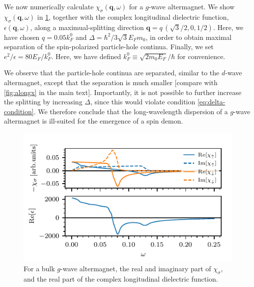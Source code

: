 \documentclass[aps,prb,reprint,twocolumns,superscriptaddress,nofootinbib]{revtex4-2}
\newcommand{\kF}{k_{F}}
\begin{document}
	
	
	We now numerically calculate $\chi_{\sigma}(\bm q,\omega)$ for a $g$-wave altermagnet. We show $\chi_{\sigma}(\bm q,\omega)$ in \cref{fig:g-wave}, together with the complex longitudinal dielectric function, $\epsilon(\bm q,\omega)$, along a maximual-splitting direction $\bm q = q\, \left(\sqrt{3}/2,0,1/2\right)$. Here, we have chosen $q=0.05\kF^0$ and $\Delta ={\hbar^2}/{3\sqrt{3}E_F m_0 }$, in order to obtain maximal separation of  the spin-polarized particle-hole continua. Finally, we set $e^2/\epsilon = 80 E_F/\kF^0$. Here, we have defined $\kF^0\equiv \sqrt{2m_0E_F}/\hbar$ for convenience. 
	
	We observe that the particle-hole continua are separated, similar to the $d$-wave altermagnet, except that the separation is much smaller [compare with \cref{fig:alongx} in the main text]. Importantly, it is not possible to further increase the splitting by increasing $\Delta$, since this would violate condition \cref{eq:delta-condition}. We therefore conclude that the long-wavelength dispersion of a $g$-wave altermagnet is ill-suited for the emergence of a spin demon.
	
	\begin{figure}
		\includegraphics{g-wave}
		\caption{For a bulk $g$-wave altermagnet, the real and imaginary part of $\chi_{\sigma}$, and the real part of the complex longitudinal dielectric function.}
		\label{fig:g-wave}
	\end{figure}
	
	
\end{document}
